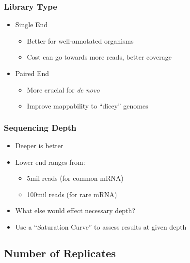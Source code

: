 \documentclass[14pt]{beamer}
\begin{document}
\begin{frame}
\frametitle{Library Type}
\begin{itemize}
	\item<1-> Single End
	\begin{itemize}
		\item<3-> Better for well-annotated organisms
		\item<4-> Cost can go towards more reads, better coverage
	\end{itemize}
	\item<2-> Paired End
	\begin{itemize}
		\item<5-> More crucial for \textit{de novo}
		\item<6-> Improve mappability to ``dicey'' genomes
	\end{itemize}	
\end{itemize}
\end{frame}

\begin{frame}
\frametitle{Sequencing Depth}
\begin{itemize}
	\item<1-> Deeper is better
	\item<2-> Lower end ranges from:
	\begin{itemize}
		\item<3-> 5mil reads (for common mRNA)
		\item<4-> 100mil reads (for rare mRNA)
	\end{itemize}
	\item<5-> What else would effect necessary depth?
	\item<7-> Use a ``Saturation Curve'' to assess results at given depth
\end{itemize}
\end{frame}
\subsection{Number of Replicates}
\end{document}
